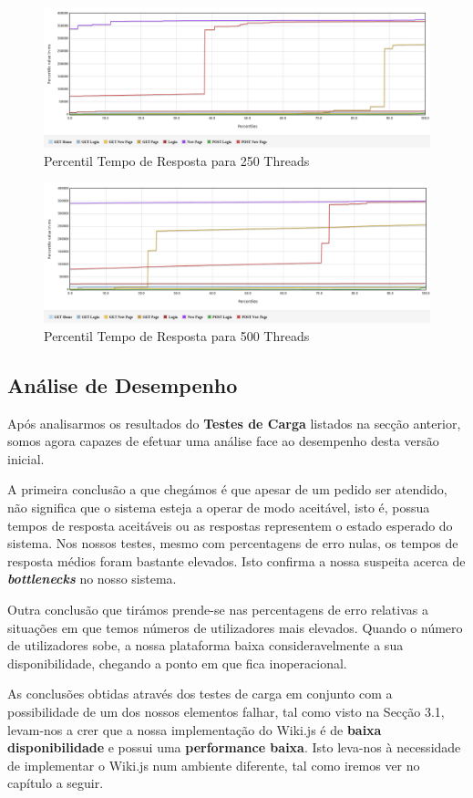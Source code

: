 \begin{figure}[ht!]
    \centering
    \includegraphics[width=.9\linewidth]{img/testes/i-t4-250.png}
    \caption{Percentil Tempo de Resposta para 250 Threads}
\end{figure}

\begin{figure}[ht!]
    \centering
    \includegraphics[width=.9\linewidth]{img/testes/i-t4-500.png}
    \caption{Percentil Tempo de Resposta para 500 Threads}
\end{figure}

\subsection{Análise de Desempenho}

Após analisarmos os resultados do \textbf{Testes de Carga} listados na secção anterior, somos agora capazes de efetuar uma análise face ao desempenho desta versão inicial.

A primeira conclusão a que chegámos é que apesar de um pedido ser atendido, não significa que o sistema esteja a operar de modo aceitável, isto é, possua tempos de resposta aceitáveis ou as respostas representem o estado esperado do sistema. Nos nossos testes, mesmo com percentagens de erro nulas, os tempos de resposta médios foram bastante elevados. Isto confirma a nossa suspeita acerca de \textbf{\textit{bottlenecks}} no nosso sistema.

Outra conclusão que tirámos prende-se nas percentagens de erro relativas a situações em que temos números de utilizadores mais elevados. Quando o número de utilizadores sobe, a nossa plataforma baixa consideravelmente a sua disponibilidade, chegando a ponto em que fica inoperacional.

As conclusões obtidas através dos testes de carga em conjunto com a possibilidade de um dos nossos elementos falhar, tal como visto na Secção 3.1, levam-nos a crer que a nossa implementação do Wiki.js é de \textbf{baixa disponibilidade} e possui uma \textbf{performance baixa}. Isto leva-nos à necessidade de implementar o Wiki.js num ambiente diferente, tal como iremos ver no capítulo a seguir.

\pagebreak